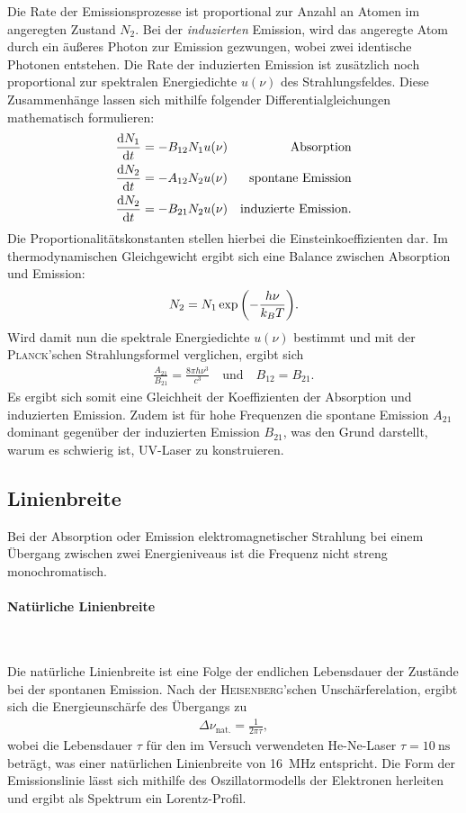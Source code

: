 \documentclass[a4paper,twoside,final]{article}
\begin{document}
Die Rate der Emissionsprozesse ist proportional zur Anzahl an Atomen im angeregten Zustand $N_2$. Bei der \emph{induzierten} Emission, wird das angeregte Atom durch ein äußeres Photon zur Emission gezwungen, wobei zwei identische Photonen entstehen. Die Rate der induzierten Emission ist zusätzlich noch proportional zur spektralen Energiedichte $u(\nu)$ des Strahlungsfeldes. Diese Zusammenhänge lassen sich mithilfe folgender Differentialgleichungen mathematisch formulieren:
\begin{align}
  \dv{N_1}{t} &= - B_{12} N_1 u(\nu) & \text{Absorption}\\
  \dv{N_2}{t} &= - A_{12} N_2 u(\nu) & \text{spontane Emission}\\
  \dv{N_2}{t} &= - B_{21} N_2 u(\nu) & \text{induzierte Emission}.
  \label{equ:Ratengleichungen}
\end{align}
Die Proportionalitätskonstanten stellen hierbei die Einsteinkoeffizienten dar. Im thermodynamischen Gleichgewicht ergibt sich eine Balance zwischen Absorption und Emission:
\begin{align}
  N_2 = N_1 \exp\qty(-\frac{h\nu}{k_B T}).
\end{align}
Wird damit nun die spektrale Energiedichte $u(\nu)$ bestimmt und mit der \textsc{Planck}'schen Strahlungsformel verglichen, ergibt sich
\begin{align}
  \frac{A_{21}}{B_{21}} = \frac{8\pi h \nu^3}{c^3} \quad \text{und} \quad B_{12} = B_{21}.\label{equ:Einsteinkoeffizienten}
\end{align}
Es ergibt sich somit eine Gleichheit der Koeffizienten der Absorption und induzierten Emission. Zudem ist für hohe Frequenzen die spontane Emission $A_{21}$ dominant gegenüber der induzierten Emission $B_{21}$, was den Grund darstellt, warum es schwierig ist, UV-Laser zu konstruieren.

\subsection{Linienbreite}
Bei der Absorption oder Emission elektromagnetischer Strahlung bei einem Übergang zwischen zwei Energieniveaus ist die Frequenz nicht streng monochromatisch.

\paragraph{Natürliche Linienbreite}$~$

Die natürliche Linienbreite ist eine Folge der endlichen Lebensdauer der Zustände bei der spontanen Emission. Nach der \textsc{Heisenberg}'schen Unschärferelation, ergibt sich die Energieunschärfe des Übergangs zu
\begin{align}
  \Delta \nu_\text{nat.} = \frac{1}{2\pi \tau},
\end{align}
wobei die Lebensdauer $\tau$ für den im Versuch verwendeten He-Ne-Laser $\tau = \SI{10}{\nano\second}$ beträgt, was einer natürlichen Linienbreite von \SI{16}{\mega\hertz} entspricht. Die Form der Emissionslinie lässt sich mithilfe des Oszillatormodells der Elektronen herleiten und ergibt als Spektrum ein Lorentz-Profil.
\end{document}
